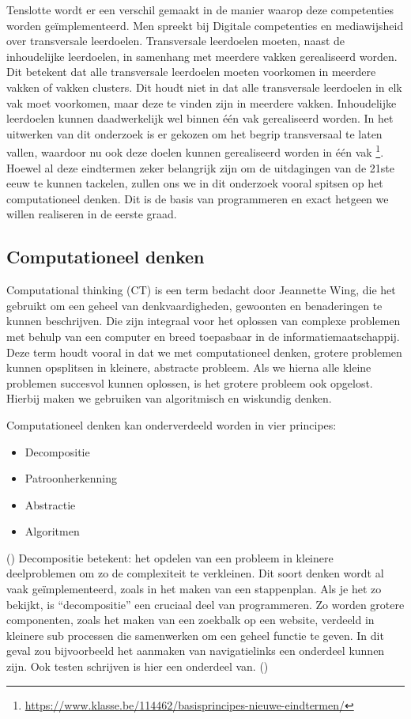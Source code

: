 Tenslotte wordt er een verschil gemaakt in de manier waarop deze competenties worden geïmplementeerd. Men spreekt bij Digitale competenties en mediawijsheid over transversale leerdoelen. Transversale leerdoelen moeten, naast de inhoudelijke leerdoelen, in samenhang met meerdere vakken gerealiseerd worden. Dit betekent dat alle transversale leerdoelen moeten voorkomen in meerdere vakken of vakken clusters. Dit houdt niet in dat alle transversale leerdoelen in elk vak moet voorkomen, maar deze te vinden zijn in meerdere vakken. Inhoudelijke leerdoelen kunnen daadwerkelijk wel binnen één vak gerealiseerd worden. In het uitwerken van dit onderzoek is er gekozen om het begrip transversaal te laten vallen, waardoor nu ook deze doelen kunnen gerealiseerd worden in één vak \footnote{\url{https://www.klasse.be/114462/basisprincipes-nieuwe-eindtermen/}}.
Hoewel al deze eindtermen zeker belangrijk zijn om de uitdagingen van de 21ste eeuw te kunnen tackelen, zullen ons we in dit onderzoek vooral spitsen op het computationeel denken. Dit is de basis van programmeren en exact hetgeen we willen realiseren in de eerste graad.

\subsection{Computationeel denken} 
Computational thinking (CT) is een term bedacht door Jeannette Wing, die het gebruikt om een geheel van denkvaardigheden, gewoonten en benaderingen te kunnen beschrijven. Die zijn integraal voor het oplossen van complexe problemen met behulp van een computer en breed toepasbaar in de informatiemaatschappij.
Deze term houdt vooral in dat we met computationeel denken, grotere problemen kunnen opsplitsen in kleinere, abstracte probleem. Als we hierna alle kleine problemen succesvol kunnen oplossen, is het grotere probleem ook opgelost. Hierbij maken we gebruiken van algoritmisch en wiskundig denken.

Computationeel denken kan onderverdeeld worden in vier principes:

\begin{itemize}
    \item Decompositie
    \item Patroonherkenning
    \item Abstractie
    \item Algoritmen
\end{itemize} (\cite{Smartschool,Vlaanderen,Llinkid2019})
Decompositie betekent: het opdelen van een probleem in kleinere deelproblemen om zo de complexiteit te verkleinen. Dit soort denken wordt al vaak geïmplementeerd, zoals in het maken van een stappenplan. Als je het zo bekijkt, is “decompositie” een cruciaal deel van programmeren. Zo worden grotere componenten, zoals het maken van een zoekbalk op een website, verdeeld in kleinere sub processen die samenwerken om een geheel functie te geven. In dit geval zou bijvoorbeeld het aanmaken van navigatielinks een onderdeel kunnen zijn. Ook testen schrijven is hier een onderdeel van.
(\cite{Smartschool})


